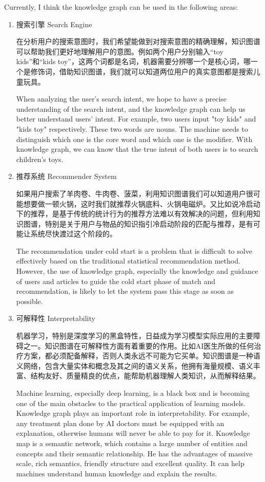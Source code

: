 \documentclass[letterpaper]{article}
\begin{document}
Currently, I think the knowledge graph can be used in the following areas:
\begin{enumerate}
\item 搜索引擎 Search Engine

在分析用户的搜索意图时，我们希望能做到对搜索意图的精确理解，知识图谱可以帮助我们更好地理解用户的意图。例如两个用户分别输入“toy kids”和“kids toy”，这两个词都是名词，机器需要分辨哪一个是核心词，哪一个是修饰词，借助知识图谱，我们就可以知道两位用户的真实意图都是搜索儿童玩具。

When analyzing the user's search intent, we hope to have a precise understanding of the search intent, and the knowledge graph can help us better understand  users' intent. For example, two users input "toy kids" and "kids toy" respectively. These two words are nouns. The machine needs to distinguish which one is the core word and which one is the modifier. With knowledge graph, we can know that the true intent of both users is to search children's toys.
\item 推荐系统 Recommender System

如果用户搜索了羊肉卷、牛肉卷、菠菜，利用知识图谱我们可以知道用户很可能想要做一顿火锅，这时我们就推荐火锅底料、火锅电磁炉。又比如说冷启动下的推荐，是基于传统的统计行为的推荐方法难以有效解决的问题，但利用知识图谱，特别是关于用户与物品的知识指引冷启动阶段的匹配与推荐，是有可能让系统尽快渡过这个阶段的。

The recommendation under cold start is a problem that is difficult to solve effectively based on the traditional statistical recommendation method. However, the use of knowledge graph, especially the knowledge and guidance of users and articles to guide the cold start phase of match and recommendation, is likely to let the system pass this stage as soon as possible.
    
\item 可解释性 Interpretability

机器学习，特别是深度学习的黑盒特性，日益成为学习模型实际应用的主要障碍之一。知识图谱在可解释性方面有着重要的作用。比如AI医生所做的任何治疗方案，都必须配备解释，否则人类永远不可能为它买单。知识图谱是一种语义网络，包含大量实体和概念及其之间的语义关系，他拥有海量规模、语义丰富、结构友好、质量精良的优点，能帮助机器理解人类知识，从而解释结果。

Machine learning, especially deep learning, is a black box and is becoming one of the main obstacles to the practical application of learning models. Knowledge graph plays an important role in interpretability. For example, any treatment plan done by AI doctors must be equipped with an explanation, otherwise humans will never be able to pay for it. Knowledge map is a semantic network, which contains a large number of entities and concepts and their semantic relationship. He has the advantages of massive scale, rich semantics, friendly structure and excellent quality. It can help machines understand human knowledge and explain the results.

\end{enumerate}
\end{document}
